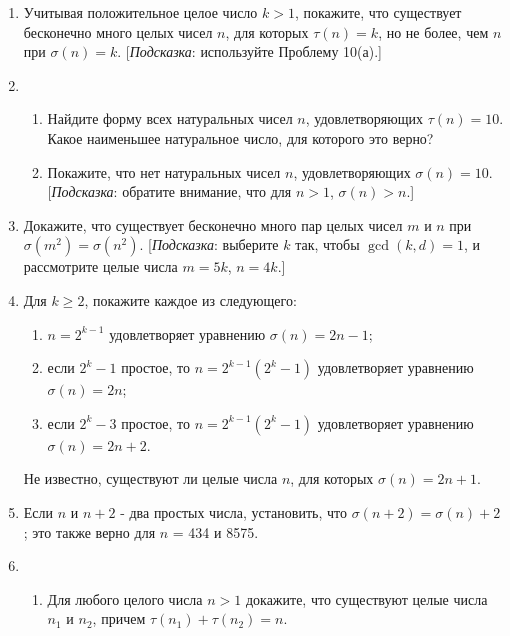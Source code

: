 \documentclass[11pt]{article}
\begin{document}
\begin{enumerate}
\begin{enumerate}
			\item  Если $n > 1$ является составным числом, то $\sigma(n)>n + \sqrt{n}$. [{\itshape Подсказка}: Пусть $d\mid n$, где $1 < d < n$, поэтому $1 < n\mid d < n$. Если $d \le \sqrt{n}$, то $n\mid d \ge \sqrt{n}$.]
		\end{enumerate}
		\item Учитывая положительное целое число $k > 1$, покажите, что существует бесконечно много целых чисел $n$, для которых $\tau(n)=k$, но не более, чем $n$ при $\sigma(n)=k$. [{\itshape Подсказка}: используйте Проблему 10(а).]
		\item 
		\begin{enumerate} 
			\item Найдите форму всех натуральных чисел $n$, удовлетворяющих $\tau(n) = 10$. Какое наименьшее натуральное число, для которого это верно?
			\item Покажите, что нет натуральных чисел $n$, удовлетворяющих $\sigma(n) = 10$. [{\itshape Подсказка}: обратите внимание, что для $n > 1$, $\sigma(n) > n$.]
		\end{enumerate}
		\item Докажите, что существует бесконечно много пар целых чисел $m$ и $n$ при $\sigma(m^{2}) = \sigma(n^{2}).$ [{\itshape Подсказка}: выберите $k$ так, чтобы $\gcd(k,d) = 1$, и рассмотрите целые числа $m = 5k$, $n = 4k$.]
		\item Для $k\ge 2 $, покажите каждое из следующего:
		\begin{enumerate} 
			\item $n = 2^{k-1}$ удовлетворяет уравнению $\sigma(n) = 2n - 1$;
			\item если $2^{k}-1$ простое, то $n = 2^{k-1}\left(2^{k}-1\right)$ удовлетворяет уравнению $\sigma(n) = 2n$;
			\item если $2^{k} - 3$ простое, то $n = 2^{k-1}\left(2^{k}-1\right)$ удовлетворяет уравнению $\sigma(n) = 2n+2$. 
		\end{enumerate}
		Не известно, существуют ли целые числа $n$, для которых $\sigma(n) = 2n + 1$.
		\item Если $n$ и $n+2$ - два простых числа, установить, что $\sigma (n+2) = \sigma (n)+2$; это также верно для $n$ = 434 и 8575.
		\item 
		\begin{enumerate} 
			\item Для любого целого числа $n > 1$ докажите, что существуют целые числа $n_{1}$ и $n_{2}$, причем $\tau(n_{1})+\tau(n_{2}) = n$.

\end{enumerate}
\end{enumerate}
\end{document}
